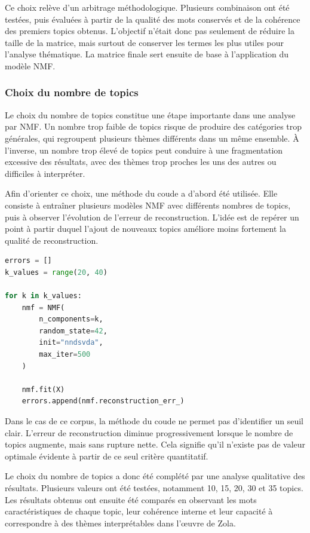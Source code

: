 \documentclass{article}
\begin{document}
Ce choix relève d'un arbitrage méthodologique. Plusieurs combinaison ont été testées, puis évaluées à partir de la qualité des mots conservés et de la cohérence des premiers topics obtenus. L'objectif n'était donc pas seulement de réduire la taille de la matrice, mais surtout de conserver les termes les plus utiles pour l'analyse thématique. La matrice finale sert ensuite de base à l'application du modèle NMF.

\subsubsection{Choix du nombre de topics}

Le choix du nombre de topics constitue une étape importante dans une analyse par NMF. Un nombre trop faible de topics risque de produire des catégories trop générales, qui regroupent plusieurs thèmes différents dans un même ensemble. À l'inverse, un nombre trop élevé de topics peut conduire à une fragmentation excessive des résultats, avec des thèmes trop proches les uns des autres ou difficiles à interpréter.

Afin d'orienter ce choix, une méthode du coude a d'abord été utilisée. Elle consiste à entraîner plusieurs modèles NMF avec différents nombres de topics, puis à observer l'évolution de l'erreur de reconstruction. L'idée est de repérer un point à partir duquel l'ajout de nouveaux topics améliore moins fortement la qualité de reconstruction.

\begin{lstlisting}[language=Python, caption={Recherche du nombre de topics par la méthode du coude}]
errors = []
k_values = range(20, 40)

for k in k_values:
    nmf = NMF(
        n_components=k,
        random_state=42,
        init="nndsvda",
        max_iter=500
    )

    nmf.fit(X)
    errors.append(nmf.reconstruction_err_)
\end{lstlisting}

Dans le cas de ce corpus, la méthode du coude ne permet pas d'identifier un seuil clair. L'erreur de reconstruction diminue progressivement lorsque le nombre de topics augmente, mais sans rupture nette. Cela signifie qu'il n'existe pas de valeur optimale évidente à partir de ce seul critère quantitatif.

Le choix du nombre de topics a donc été complété par une analyse qualitative des résultats. Plusieurs valeurs ont été testées, notamment 10, 15, 20, 30 et 35 topics. Les résultats obtenus ont ensuite été comparés en observant les mots caractéristiques de chaque topic, leur cohérence interne et leur capacité à correspondre à des thèmes interprétables dans l'œuvre de Zola.
\end{document}
